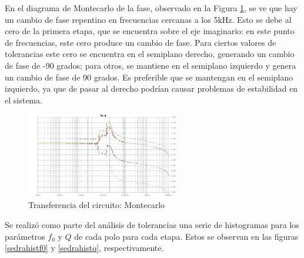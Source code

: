 \documentclass[spanish]{article}
\begin{document}
En el diagrama de Montecarlo de la fase, observado en la Figura \ref{montecarlofase}, se ve que hay un cambio de fase repentino en frecuencias cercanas a los 5kHz. Esto se debe al cero de la primera etapa, que se encuentra sobre el eje imaginario: en este punto de frecuencias, este cero produce un cambio de fase. Para ciertos valores de tolerancias este cero se encuentra en el semiplano derecho, generando un cambio de fase de -90 grados; para otros, se mantiene en el semiplano izquierdo y genera un cambio de fase de 90 grados. Es preferible que se mantengan en el semiplano izquierdo, ya que de pasar al derecho podrían causar problemas de estabilidad en el sistema.

\begin{figure}[H]
    \centering
    \includegraphics[width=0.6\textwidth]{Resources/montecarlofase.png}
    \caption{Transferencia del circuito: Montecarlo}
    \label{montecarlofase}
\end{figure}

Se realizó como parte del análisis de tolerancias una serie de histogramas para los parámetros $f_{0}$ y $Q$ de cada polo para cada etapa. Estos se observan en las figuras \ref{sedrahistf0} y \ref{sedrahistq}, respectivamente.
\end{document}
